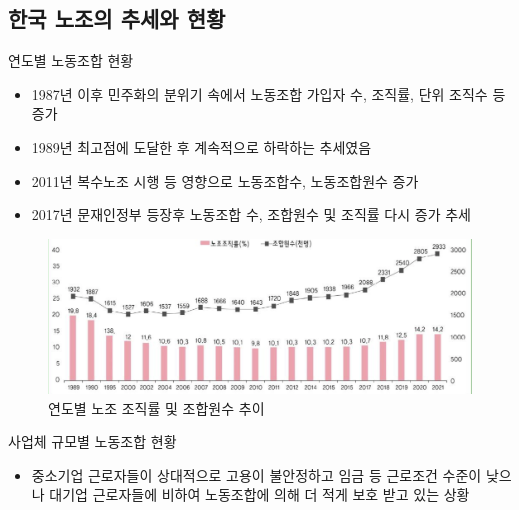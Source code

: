 \documentclass[aspectratio=169,xcolor=dvipsnames,handout]{beamer}
\begin{document}
\subsection{한국 노조의 추세와 현황}

\begin{frame}{연도별 노동조합 현황}
    \begin{itemize}[<+->]
        \item 1987년 이후 민주화의 분위기 속에서 노동조합 가입자 수, 조직률, 단위 조직수 등 증가
        \item 1989년 최고점에 도달한 후 계속적으로 하락하는 추세였음
        \item 2011년 복수노조 시행 등 영향으로 노동조합수, 노동조합원수 증가
        \item 2017년 문재인정부 등장후 노동조합 수, 조합원수 및 조직률 다시 증가 추세
    \end{itemize}
\end{frame}

\begin{frame}
\centering
\begin{figure}
    \includegraphics[width=.8\textwidth]{pic/연도별노조조직률및조합원수추이.png}
    \caption{연도별 노조 조직률 및 조합원수 추이}
\end{figure}
\end{frame}

\begin{frame}{사업체 규모별 노동조합 현황}
    \begin{itemize}[<+->]
        \item 중소기업 근로자들이 상대적으로 고용이 불안정하고 임금 등 근로조건 수준이 낮으나 대기업 근로자들에 비하여 노동조합에 의해 더 적게 보호 받고 있는 상황
    \end{itemize}
    \scriptsize
    \begin{table}
        \centering
        \resizebox{.8\textwidth}{!}{\relax
            
        }
        \\
        \raggedright\relax %
        \caption{사업체 규모별 노동조합 조직 현황}
    \end{table}
\end{frame}
\end{document}
